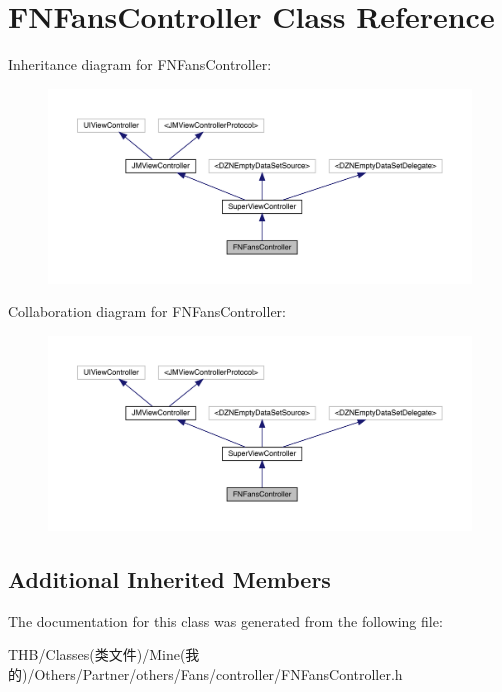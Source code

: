 \hypertarget{interface_f_n_fans_controller}{}\section{F\+N\+Fans\+Controller Class Reference}
\label{interface_f_n_fans_controller}


Inheritance diagram for F\+N\+Fans\+Controller\+:\nopagebreak
\begin{figure}[H]
\begin{center}
\leavevmode
\includegraphics[width=350pt]{interface_f_n_fans_controller__inherit__graph}
\end{center}
\end{figure}


Collaboration diagram for F\+N\+Fans\+Controller\+:\nopagebreak
\begin{figure}[H]
\begin{center}
\leavevmode
\includegraphics[width=350pt]{interface_f_n_fans_controller__coll__graph}
\end{center}
\end{figure}
\subsection*{Additional Inherited Members}


The documentation for this class was generated from the following file\+:\begin{DoxyCompactItemize}
\item 
T\+H\+B/\+Classes(类文件)/\+Mine(我的)/\+Others/\+Partner/others/\+Fans/controller/F\+N\+Fans\+Controller.\+h\end{DoxyCompactItemize}
